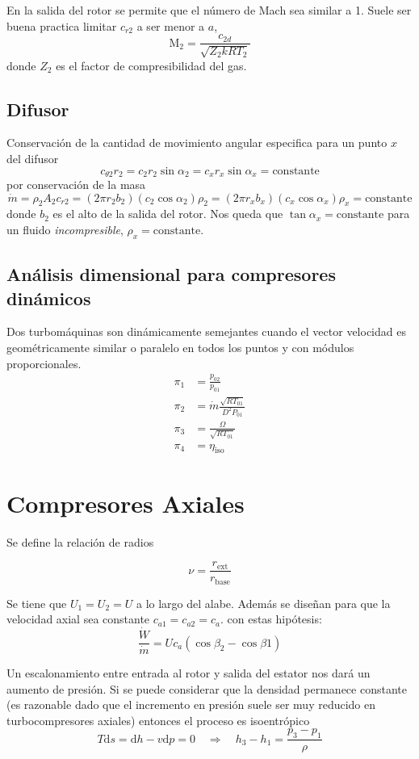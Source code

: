 \documentclass{article}
\newcommand{\substy}[2]{\ensuremath{{#1_{\mathrm{#2}}}}}
\newcommand{\gasconst}{k}
\newcommand{\ctegas}{\gasconst}
\newcommand{\speedsound}{a}
\newcommand{\ctan}[1]{\ensuremath{c_{\theta #1}}}
\newcommand{\crad}[1]{\ensuremath{c_{r #1}}}
\newcommand{\cax}[1]{\ensuremath{c_{a #1}}}
\newcommand{\Mach}{\textrm{M}}
\newcommand{\di}{\textrm{d}}
\newcommand{\cte}{\textrm{constante}}
\newcommand{\dW}{\dot{W}}
\newcommand{\dm}{\dot{m}}
\newcommand{\etaTot}{\substy{\eta}{iso}}
\newcommand{\radrel}{\nu}
\newcommand{\rext}{\substy{r}{ext}}
\newcommand{\rbase}{\substy{r}{base}}
\begin{document}
En la salida del rotor se permite que el número de Mach sea similar a 1. Suele ser buena practica limitar $\crad{2}$ a ser menor a $\speedsound$,
\[
\Mach_2 = \frac{c_{2d}}{\sqrt{Z_2\ctegas R T_2}}
\]
donde $Z_2$ es el factor de compresibilidad del gas.


\subsection{Difusor}
\newcommand{\equis}{{\ensuremath{x}}}
Conservación de la cantidad de movimiento angular especifica para un punto \equis{} del difusor 
\[
\ctan{2} r_2 = c_2 r_2 \sin \alpha_2= c_\equis r_\equis \sin \alpha_\equis  = \cte
\]
por conservación de la masa
\[
\dm = \rho_2 A_2 \crad{2}  = (2\pi r_2 b_2 )(c_2 \cos \alpha_2) \rho_2 = (2\pi r_\equis b_\equis )(c_\equis \cos \alpha_\equis) \rho_\equis =\cte 
\]
donde $b_2$ es el alto de la salida del rotor. Nos  queda que $\tan \alpha_\equis=\cte$ para un fluido \textit{incompresible}, $\rho_\equis = \cte$.
\subsection{Análisis dimensional para compresores dinámicos}
Dos turbomáquinas son dinámicamente semejantes cuando el vector velocidad es geométricamente similar o paralelo en todos los puntos y con módulos proporcionales.
\begin{align}
    \pi_1 &= \frac{p_{02}}{p_{01}}\\
    \pi_2 &= \dm\frac{\sqrt{R T_{01}}}{D^2 P_{01}}\\
    \pi_3 &= \frac{\Omega}{\sqrt{RT_{01}}}\\
    \pi_4 &= \etaTot
\end{align}

\section{Compresores Axiales}
Se define la relación de radios

\[
\radrel = \frac{\rext}{\rbase}
\]

Se tiene que $U_1=U_2=U$ a lo largo del alabe. Además se diseñan para que la velocidad axial sea constante $\cax{1}=\cax{2}=\cax{}$. con estas hipótesis:
\[
\frac{\dW}{\dm}=U \cax{} (\cos \beta_2 - \cos \beta 1 )
\]

Un escalonamiento entre entrada al rotor y salida del estator nos dará un aumento de presión. Si se puede considerar que la densidad permanece constante (es razonable dado que el incremento en presión suele ser muy reducido en turbocompresores axiales) entonces el proceso es isoentrópico
\[
T\di s = \di h - v \di p =0\quad \Rightarrow \quad h_3 - h_1 = \frac{p_3-p_1}{\rho}
\]
\end{document}
